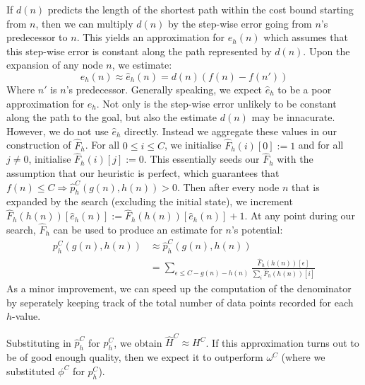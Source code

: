 \documentclass[letterpaper]{article} %
\begin{document}
If \(d(n)\) predicts the length of the shortest path within the cost bound
starting from \(n\),
then we can multiply \(d(n)\) by the step-wise error going from \(n\)'s predecessor to \(n\).
This yields an approximation for \(e_h(n)\) which assumes that this step-wise error
is constant along the path represented by \(d(n)\).
Upon the expansion of any node \(n\), we estimate:
\[e_h(n) \approx \hat{e}_h(n) = d(n) (f(n) - f(n'))\]
Where \(n'\) is \(n\)'s predecessor. Generally speaking, we expect \(\hat{e}_h\) to be a poor
approximation for \(e_h\). Not only is the step-wise error unlikely to be constant
along the path to the goal, but also the estimate \(d(n)\) may be innacurate.
However, we do not use \(\hat{e}_h\) directly. Instead we aggregate these values in our construction of \(\hat{F}_h\).
For all \(0 \leq i \leq C\), we initialise \(\hat{F}_h(i)[0] := 1\) and for all \(j \not = 0\),
initialise \(\hat{F}_h(i)[j] := 0\).
This essentially seeds our \(\hat{F}_h\) with the assumption that our heuristic
is perfect, which guarantees that \(f(n) \leq C \Rightarrow \hat{p}^C_h(g(n), h(n)) > 0\).
Then after every node \(n\) that is expanded by the search (excluding the initial state),
we increment \(\hat{F}_h(h(n))[\hat{e}_h(n)] := \hat{F}_h(h(n))[\hat{e}_h(n)] + 1\).
At any point during our search, \(\hat{F}_h\) can be used to produce an estimate for \(n\)'s potential:
\begin{align*}
  p^C_h(g(n), h(n)) & \approx \hat{p}^C_h(g(n), h(n)) \\
   & = \sum_{\epsilon \leq C - g(n) - h(n)} \frac{\hat{F}_h(h(n))[\epsilon]}
{\sum_i \hat{F}_h(h(n))[i]}
\end{align*}
As a minor improvement, we can speed up the computation of the denominator by seperately
keeping track of the total
number of data points recorded for each \(h\)-value.

Substituting in  \(\hat{p}^C_h\) for \(p^C_h\), we obtain \(\hat{H}^C \approx H^C\).
If this approximation turns out to be of good enough quality,
then we expect it to outperform \(\omega^C\) (where we substituted \(\phi^C\) for \(p^C_h\)).



\end{document}
